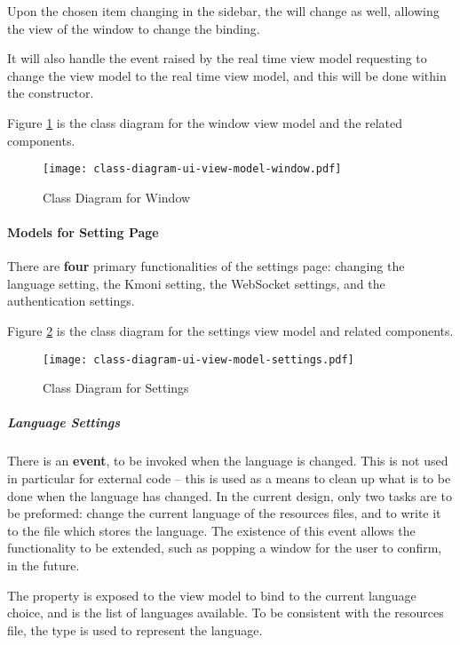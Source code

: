 Upon the chosen item changing in the sidebar, the  will change as well, allowing the view of the window to change the binding.

It will also handle the event raised by the real time view model requesting to change the view model to the real time view model, and this will be done within the constructor.

Figure \ref{fig:class-diagram-ui-window} is the class diagram for the window view model and the related components.

\begin{figure}[htp]
    \centering
    \texttt{[image: class-diagram-ui-view-model-window.pdf]}
    \caption{Class Diagram for Window}
    \label{fig:class-diagram-ui-window}
\end{figure}

\paragraph{Models for Setting Page}

There are \textbf{four} primary functionalities of the settings page: changing the language setting, the Kmoni setting, the WebSocket settings, and the authentication settings.

Figure \ref{fig:class-diagram-ui-settings} is the class diagram for the settings view model and related components.

\begin{figure}[htp]
    \centering
    \texttt{[image: class-diagram-ui-view-model-settings.pdf]}
    \caption{Class Diagram for Settings}
    \label{fig:class-diagram-ui-settings}
\end{figure}

\subparagraph{Language Settings}

There is an \textbf{event},  to be invoked when the language is changed. This is not used in particular for external code -- this is used as a means to clean up what is to be done when the language has changed. In the current design, only two tasks are to be preformed: change the current language of the resources files, and to write it to the file which stores the language. The existence of this event allows the functionality to be extended, such as popping a window for the user to confirm, in the future.

The property  is exposed to the view model to bind to the current language choice, and  is the list of languages available. To be consistent with the resources file, the type  is used to represent the language.

